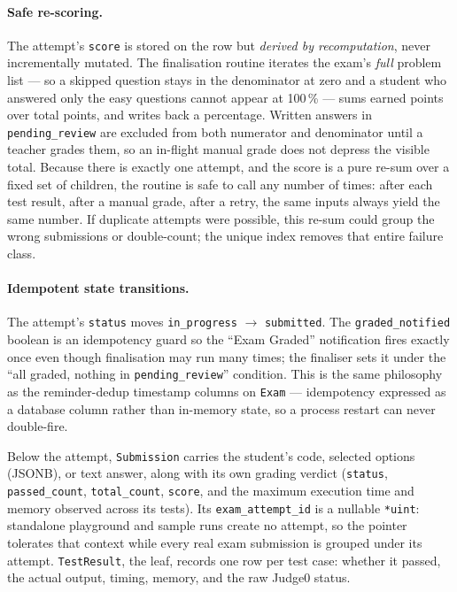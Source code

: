 \paragraph{Safe re-scoring.} The attempt's \texttt{score} is stored on the
row but \emph{derived by recomputation}, never incrementally mutated. The
finalisation routine iterates the exam's \emph{full} problem list ---
so a skipped question stays in the denominator at zero and a student who
answered only the easy questions cannot appear at 100\,\% --- sums earned
points over total points, and writes back a percentage. Written answers in
\texttt{pending\_review} are excluded from both numerator and denominator
until a teacher grades them, so an in-flight manual grade does not depress
the visible total. Because there is exactly one attempt, and the score is a
pure re-sum over a fixed set of children, the routine is safe to call any
number of times: after each test result, after a manual grade, after a retry,
the same inputs always yield the same number. If duplicate attempts were
possible, this re-sum could group the wrong submissions or double-count; the
unique index removes that entire failure class.

\paragraph{Idempotent state transitions.} The attempt's \texttt{status}
moves \texttt{in\_progress} $\rightarrow$ \texttt{submitted}. The
\texttt{graded\_notified} boolean is an idempotency guard so the ``Exam
Graded'' notification fires exactly once even though finalisation may run
many times; the finaliser sets it under the ``all graded, nothing in
\texttt{pending\_review}'' condition. This is the same philosophy as the
reminder-dedup timestamp columns on \texttt{Exam} --- idempotency expressed
as a database column rather than in-memory state, so a process restart can
never double-fire.

Below the attempt, \texttt{Submission} carries the student's code, selected
options (JSONB), or text answer, along with its own grading verdict
(\texttt{status}, \texttt{passed\_count}, \texttt{total\_count},
\texttt{score}, and the maximum execution time and memory observed across its
tests). Its \texttt{exam\_attempt\_id} is a nullable \texttt{*uint}: standalone
playground and sample runs create no attempt, so the pointer tolerates that
context while every real exam submission is grouped under its attempt.
\texttt{TestResult}, the leaf, records one row per test case: whether it
passed, the actual output, timing, memory, and the raw Judge0 status.

